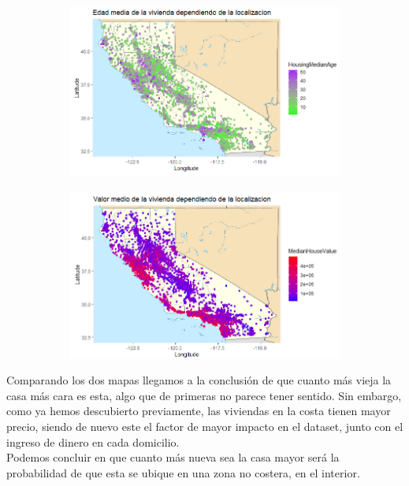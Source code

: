 \begin{figure}[!tbh]
	\centering
	\begin{subfigure}{0.5\textwidth}
	\includegraphics[width=1\linewidth]{figures/hipo_6}
\caption{}
\label{fig:hipo6}
	\end{subfigure}\hfil %
	\begin{subfigure}{0.5\textwidth}
	\includegraphics[width=1\linewidth]{figures/hipo_7}
\caption{}
\label{fig:hipo7}
	\end{subfigure}\hfil %
\end{figure}



Comparando los dos mapas llegamos a la conclusión de que cuanto más vieja la casa más cara es esta, algo que de primeras no parece tener sentido. Sin embargo, como ya hemos descubierto previamente, las viviendas en la costa tienen mayor precio, siendo de nuevo este el factor de mayor impacto en el dataset, junto con el ingreso de dinero en cada domicilio.\\

Podemos concluir en que cuanto más nueva sea la casa mayor será la probabilidad de que esta se ubique en una zona no costera, en el interior. 



